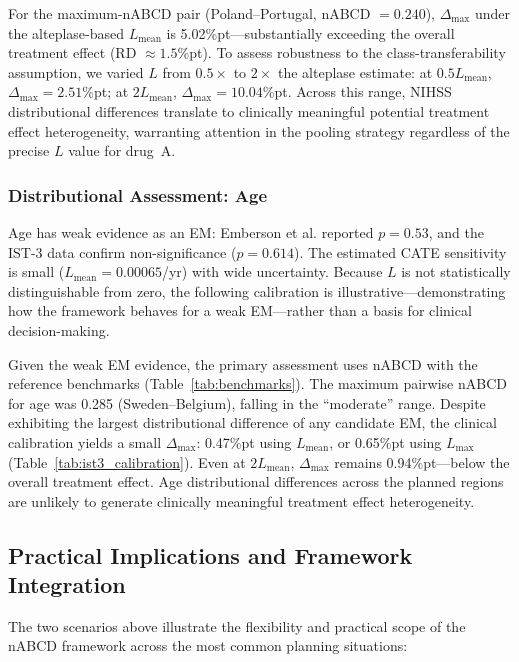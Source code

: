 \documentclass[AMA,Times1COL]{WileyNJDv5}
\begin{document}
For the maximum-nABCD pair (Poland--Portugal, nABCD $= 0.240$), $\Delta_{\max}$ under the alteplase-based $L_{\text{mean}}$ is 5.02\%pt---substantially exceeding the overall treatment effect (RD $\approx 1.5$\%pt). To assess robustness to the class-transferability assumption, we varied $L$ from $0.5\times$ to $2\times$ the alteplase estimate: at $0.5 L_{\text{mean}}$, $\Delta_{\max} = 2.51$\%pt; at $2 L_{\text{mean}}$, $\Delta_{\max} = 10.04$\%pt. Across this range, NIHSS distributional differences translate to clinically meaningful potential treatment effect heterogeneity, warranting attention in the pooling strategy regardless of the precise $L$ value for drug~A.

\subsubsection{Distributional Assessment: Age}\label{sec:case_b_age}

Age has weak evidence as an EM: Emberson et al.\cite{emberson2014} reported $p = 0.53$, and the IST-3 data confirm non-significance ($p = 0.614$). The estimated CATE sensitivity is small ($L_{\text{mean}} = 0.00065$/yr) with wide uncertainty. Because $L$ is not statistically distinguishable from zero, the following calibration is illustrative---demonstrating how the framework behaves for a weak EM---rather than a basis for clinical decision-making.

Given the weak EM evidence, the primary assessment uses nABCD with the reference benchmarks (Table~\ref{tab:benchmarks}). The maximum pairwise nABCD for age was 0.285 (Sweden--Belgium), falling in the ``moderate'' range. Despite exhibiting the largest distributional difference of any candidate EM, the clinical calibration yields a small $\Delta_{\max}$: 0.47\%pt using $L_{\text{mean}}$, or 0.65\%pt using $L_{\max}$ (Table~\ref{tab:ist3_calibration}). Even at $2 L_{\text{mean}}$, $\Delta_{\max}$ remains 0.94\%pt---below the overall treatment effect. Age distributional differences across the planned regions are unlikely to generate clinically meaningful treatment effect heterogeneity.

\subsection{Practical Implications and Framework Integration}\label{sec:app_implications}

The two scenarios above illustrate the flexibility and practical scope of the nABCD framework across the most common planning situations:
\end{document}
